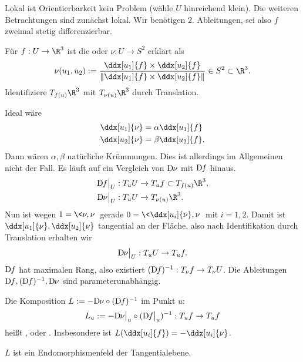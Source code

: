 Lokal ist Orientierbarkeit kein Problem (wähle $U$ hinreichend klein).
Die weiteren Betrachtungen sind zunächst lokal.
Wir benötigen 2. Ableitungen, sei also $f$ zweimal stetig differenzierbar.

\begin{df}
	Für $f: U \to \R^3$ ist die  oder  $\nu: U \to S^2$ erklärt als
	\[
		\nu(u_1, u_2) := \dfrac{\ddx[u_1]{f} \times \ddx[u_2]{f}}{\|\ddx[u_1]{f} \times \ddx[u_2]{f}\|} \in S^2 \subset \R^3.
	\]
	Identifiziere $T_{f(u)} \R^3$ mit $T_{\nu(u)}\R^3$ durch Translation.
\end{df}

Ideal wäre
\begin{align*}
	\ddx[u_1]{\nu} &= \alpha \ddx[u_1]{f} \\
	\ddx[u_2]{\nu} &= \beta \ddx[u_2]{f}.
\end{align*}
Dann wären $\alpha, \beta$ natürliche Krümmungen.
Dies ist allerdings im Allgemeinen nicht der Fall.
Es läuft auf ein Vergleich von $\Df[\nu]$ mit $\Df$ hinaus.
\begin{align*}
	\Df\big|_U : T_u U  &\bijto T_u f \subset T_{f(u)} \R^3, \\
	\Df[\nu]\big|_U : T_u U &\to T_{\nu(u)} \R^3.
\end{align*}
Nun ist wegen $1 = \<\nu, \nu\>$ gerade $0 = \<\ddx[u_i]{\nu}, \nu\>$ mit $i = 1,2$.
Damit ist $\ddx[u_1]{\nu}, \ddx[u_2]{\nu}$ tangential an der Fläche, also nach Identifikation durch Translation erhalten wir
\[
	\Df[\nu]\big|_U : T_u U \to T_u f.
\]
$\Df$ hat maximalen Rang, also existiert $(\Df)^{-1}: T_\nu f \to T_\nu U$.
Die Ableitungen $\Df, (\Df)^{-1}, \Df[\nu]$ sind parameterunabhängig.

\begin{df}[Weingartenabbildung]
	Die Komposition $L := -\Df[\nu] \circ (\Df)^{-1}$ im Punkt $u$:
	\[
		L_u := -\Df[\nu]\big|_u \circ (\Df\big|_u)^{-1} : T_u f \to T_u f
	\]
	heißt , oder .
	Insbesondere ist $L(\ddx[u_i]{f}) = - \ddx[u_i]{\nu}$.
\end{df}

$L$ ist ein Endomorphismenfeld der Tangentialebene.

